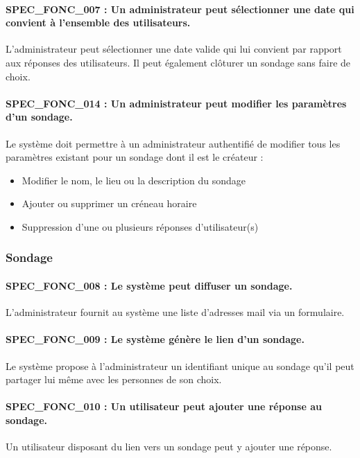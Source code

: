 \documentclass[titlepage]{report}
\begin{document}
\paragraph{SPEC\_FONC\_007 : Un administrateur peut sélectionner une date qui convient à l’ensemble des utilisateurs.}
L’administrateur peut sélectionner une date valide qui lui convient par rapport aux réponses des utilisateurs. Il peut également clôturer un sondage sans faire de choix.

\paragraph{SPEC\_FONC\_014 : Un administrateur peut modifier les paramètres d’un sondage.}
Le système doit permettre à un administrateur authentifié de modifier tous les paramètres existant pour un sondage dont il est le créateur : \begin{itemize}
\item Modifier le nom, le lieu ou la description du sondage
\item Ajouter ou supprimer un créneau horaire
\item Suppression d’une ou plusieurs réponses d’utilisateur(s) \end{itemize}

\subsubsection{Sondage}

\paragraph{SPEC\_FONC\_008 : Le système peut diffuser un sondage.}
L’administrateur fournit au système une liste d’adresses mail via un formulaire. 

\paragraph{SPEC\_FONC\_009 : Le système génère le lien d’un sondage.}
Le système propose à l’administrateur un identifiant unique au sondage qu’il peut partager lui même avec les personnes de son choix.

\paragraph{SPEC\_FONC\_010 : Un utilisateur peut ajouter une réponse au sondage.}
Un utilisateur disposant du lien vers un sondage peut y ajouter une réponse. 
\end{document}
